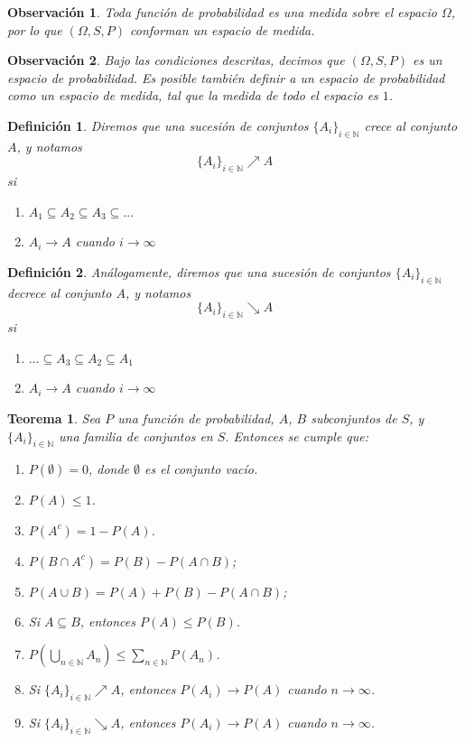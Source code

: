 \documentclass{report}
\newtheorem{thm}{Teorema}[section]
\newtheorem{dfn}{Definición}[section]
\newtheorem{obs}{Observación}[section]
\begin{document}
\begin{obs}
    Toda función de probabilidad es una medida sobre el espacio $\Omega$, por lo que $(\Omega, S, P)$ conforman un espacio de medida.
\end{obs}

\begin{obs}
    Bajo las condiciones descritas, decimos que $(\Omega, S, P)$ es un \emph{espacio de probabilidad}. Es posible también definir
    a un espacio de probabilidad como un espacio de medida, tal que la medida de todo el espacio es $1$.
\end{obs}

\begin{dfn}
Diremos que una sucesión de conjuntos $\{A_i\}_{i\in\mathbb{N}}$ \emph{crece} al conjunto $A$, y notamos
$$
\{A_i\}_{i\in\mathbb{N}}\nearrow A
$$
si
\begin{enumerate}
    \item $A_1 \subseteq A_2 \subseteq A_3 \subseteq \dots$
    \item $A_i \rightarrow A$ cuando $i\rightarrow \infty$
\end{enumerate}
\end{dfn}

\begin{dfn}
Análogamente, diremos que una sucesión de conjuntos $\{A_i\}_{i\in\mathbb{N}}$ \emph{decrece} al conjunto $A$, y notamos
$$
\{A_i\}_{i\in\mathbb{N}}\searrow A
$$
si
\begin{enumerate}
    \item $\ldots \subseteq A_3 \subseteq A_2 \subseteq A_1 $
    \item $A_i \rightarrow A$ cuando $i\rightarrow \infty$
\end{enumerate}
\end{dfn}

\begin{thm}
Sea \( P \) una función de probabilidad, $A$, $B$ subconjuntos de \(S\), y $\{A_i\}_{i\in\mathbb{N}}$ una familia de conjuntos en $S$. 
Entonces se cumple que:

\begin{enumerate}
    \item \( P(\emptyset) = 0 \), donde \( \emptyset \) es el conjunto vacío.
    \item \( P(A) \leq 1 \).
    \item \( P(A^c) = 1 - P(A) \).
    \item \( P(B \cap A^c) = P(B) - P(A \cap B) \);
    \item \( P(A \cup B) = P(A) + P(B) - P(A \cap B) \);
    \item Si \( A \subseteq B \), entonces \( P(A) \leq P(B) \).
    \item $P\left(\bigcup_{n\in\mathbb{N}}A_n\right) \leq \sum_{n\in\mathbb{N}}P(A_n)$.
    \item Si $\{A_i\}_{i\in\mathbb{N}}\nearrow A$, entonces $P(A_i)\rightarrow P(A)$ cuando $n\rightarrow \infty$.
    \item Si $\{A_i\}_{i\in\mathbb{N}}\searrow A$, entonces $P(A_i)\rightarrow P(A)$ cuando $n\rightarrow \infty$.
\end{enumerate}
\end{thm}
\end{document}

